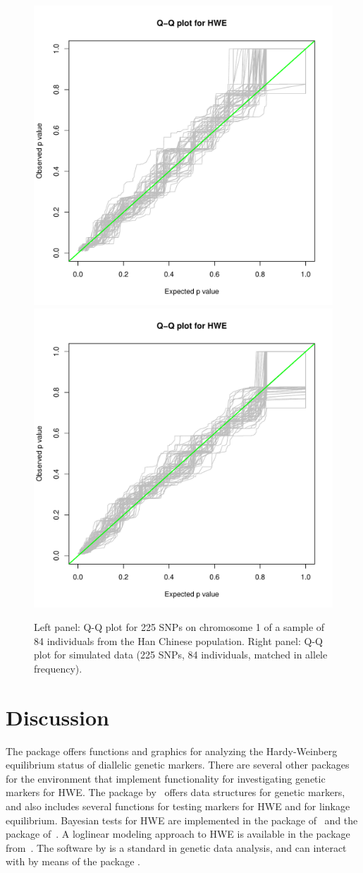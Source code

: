 \documentclass[nojss]{jss}
\begin{document}
\begin{figure}[t!]
\centering
\includegraphics[width=.5\textwidth, trim=0 10 0 20, clip]{HWHapMapQQplot.pdf}%
\includegraphics[width=.5\textwidth, trim=0 10 0 20, clip]{HWHapMapQQplotSimulated.pdf}
\caption{Left panel: Q-Q plot for 225 SNPs on chromosome 1 of a sample
  of 84 individuals from the Han Chinese population. Right panel: Q-Q
  plot for simulated data (225 SNPs, 84 individuals, matched in allele
  frequency).}\label{fig:qqplot2}
\end{figure}

\section{Discussion}
\label{sec:others}

The package  offers functions
and graphics for analyzing the Hardy-Weinberg equilibrium status of
diallelic genetic markers. There are several other packages for the
 environment that implement functionality for
investigating genetic markers for HWE. The package 
by~\cite{Warnes} offers data structures for genetic markers, and also
includes several functions for testing markers for HWE and for linkage
equilibrium. Bayesian tests for HWE are implemented in the package
 of~\cite{Wakefield} and the package 
of~\cite{Venturini}. A loglinear modeling approach to HWE is available
in the package  from~\cite{Maindonald}.  The 
software by \citet{Purcell} is a standard in
genetic data analysis, and can interact with  by means of
the package  \citep{Rserve}.
\end{document}
